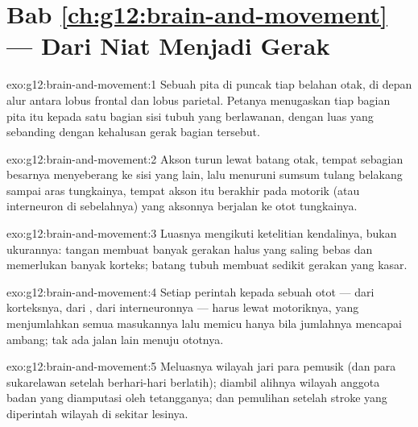 \section*{Bab \ref{ch:g12:brain-and-movement} --- Dari Niat Menjadi Gerak}

\begin{solution}{exo:g12:brain-and-movement:1}
Sebuah pita di puncak tiap belahan otak, di depan alur antara lobus
frontal dan lobus parietal. Petanya menugaskan tiap bagian pita itu
kepada satu bagian sisi tubuh yang berlawanan, dengan luas yang
sebanding dengan kehalusan gerak bagian tersebut.
\end{solution}

\begin{solution}{exo:g12:brain-and-movement:2}
Akson   turun lewat batang otak, tempat sebagian
besarnya menyeberang ke sisi yang lain, lalu menuruni sumsum tulang
belakang sampai aras tungkainya, tempat akson itu berakhir pada 
motorik (atau interneuron di sebelahnya) yang aksonnya berjalan ke otot
tungkainya.
\end{solution}

\begin{solution}{exo:g12:brain-and-movement:3}
Luasnya mengikuti ketelitian kendalinya, bukan ukurannya: tangan
membuat banyak gerakan halus yang saling bebas dan memerlukan banyak
 korteks; batang tubuh membuat sedikit gerakan yang kasar.
\end{solution}

\begin{solution}{exo:g12:brain-and-movement:4}
Setiap perintah kepada sebuah otot --- dari korteksnya, dari , dari interneuronnya --- harus lewat  motoriknya, yang
menjumlahkan semua masukannya lalu memicu hanya bila jumlahnya mencapai
ambang; tak ada jalan lain menuju ototnya.
\end{solution}

\begin{solution}{exo:g12:brain-and-movement:5}
Meluasnya wilayah jari para pemusik (dan para sukarelawan setelah
berhari-hari berlatih); diambil alihnya wilayah anggota badan yang
diamputasi oleh tetangganya; dan pemulihan setelah stroke yang
diperintah wilayah di sekitar lesinya.
\end{solution}

